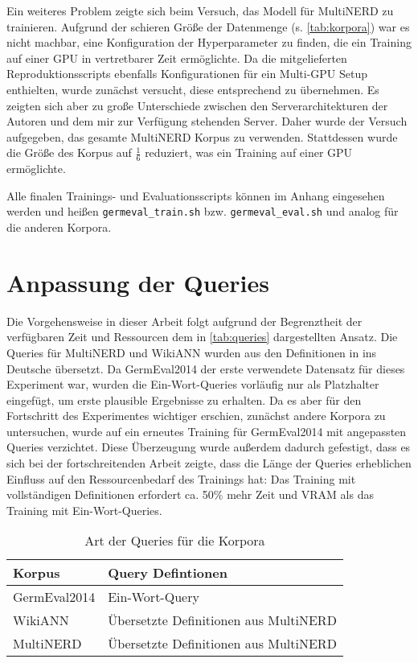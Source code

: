 Ein weiteres Problem zeigte sich beim Versuch, das Modell für MultiNERD zu trainieren. Aufgrund der schieren Größe der Datenmenge (s. \autoref{tab:korpora}) war es nicht machbar, eine Konfiguration der Hyperparameter zu finden, die ein Training auf einer GPU in vertretbarer Zeit ermöglichte. Da die mitgelieferten Reproduktionsscripts ebenfalls Konfigurationen für ein Multi-GPU Setup enthielten, wurde zunächst versucht, diese entsprechend zu übernehmen. Es zeigten sich aber zu große Unterschiede zwischen den Serverarchitekturen der Autoren und dem mir zur Verfügung stehenden Server. Daher wurde der Versuch aufgegeben, das gesamte MultiNERD Korpus zu verwenden. Stattdessen wurde die Größe des Korpus auf \(\frac{1}{6}\) reduziert, was ein Training auf einer GPU ermöglichte.

Alle finalen Trainings- und Evaluationsscripts können im Anhang eingesehen werden und heißen \verb|germeval_train.sh| bzw. \verb|germeval_eval.sh| und analog für die anderen Korpora.


\section{Anpassung der Queries}
\label{ch:Training:sec:Anpassung_Queries}


Die Vorgehensweise in dieser Arbeit folgt aufgrund der Begrenztheit der verfügbaren Zeit und Ressourcen dem in \autoref{tab:queries} dargestellten Ansatz. Die Queries für MultiNERD und WikiANN wurden aus den Definitionen in \cite[4]{multinerd} ins Deutsche übersetzt. Da GermEval2014 der erste verwendete Datensatz für dieses Experiment war, wurden die Ein-Wort-Queries vorläufig nur als Platzhalter eingefügt, um erste plausible Ergebnisse zu erhalten. Da es aber für den Fortschritt des Experimentes wichtiger erschien, zunächst andere Korpora zu untersuchen, wurde auf ein erneutes Training für GermEval2014 mit angepassten Queries verzichtet. Diese Überzeugung wurde außerdem dadurch gefestigt, dass es sich bei der fortschreitenden Arbeit zeigte, dass die Länge der Queries erheblichen Einfluss auf den Ressourcenbedarf des Trainings hat: Das Training mit vollständigen Definitionen erfordert ca. 50\% mehr Zeit und VRAM als das Training mit Ein-Wort-Queries.

\begin{table}[!htbp]
	\centering
	\caption{Art der Queries für die Korpora}
	\label{tab:queries}
	\begin{tabular}{@{}ll@{}}
	\toprule
		\textbf{Korpus} & \textbf{Query Defintionen} \\ \midrule
		GermEval2014    & Ein-Wort-Query             \\
		WikiANN         & Übersetzte Definitionen aus MultiNERD \\
		MultiNERD       & Übersetzte Definitionen aus MultiNERD \\ \bottomrule
	\end{tabular}
\end{table}

